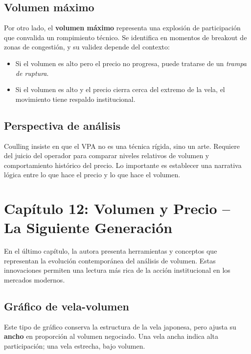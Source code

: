 \subsection*{Volumen máximo}

Por otro lado, el \textbf{volumen máximo} representa una explosión de participación que convalida un rompimiento técnico. Se identifica en momentos de breakout de zonas de congestión, y su validez depende del contexto:
\begin{itemize}
  \item Si el volumen es alto pero el precio no progresa, puede tratarse de un \textit{trampa de ruptura}.
  \item Si el volumen es alto y el precio cierra cerca del extremo de la vela, el movimiento tiene respaldo institucional.
\end{itemize}

\subsection*{Perspectiva de análisis}

Coulling insiste en que el VPA no es una técnica rígida, sino un arte. Requiere del juicio del operador para comparar niveles relativos de volumen y comportamiento histórico del precio. Lo importante es establecer una narrativa lógica entre lo que hace el precio y lo que hace el volumen.

\vspace{1em}

\section*{Capítulo 12: Volumen y Precio – La Siguiente Generación}

En el último capítulo, la autora presenta herramientas y conceptos que representan la evolución contemporánea del análisis de volumen. Estas innovaciones permiten una lectura más rica de la acción institucional en los mercados modernos.

\subsection*{Gráfico de vela-volumen}

Este tipo de gráfico conserva la estructura de la vela japonesa, pero ajusta su \textbf{ancho} en proporción al volumen negociado. Una vela ancha indica alta participación; una vela estrecha, bajo volumen.

